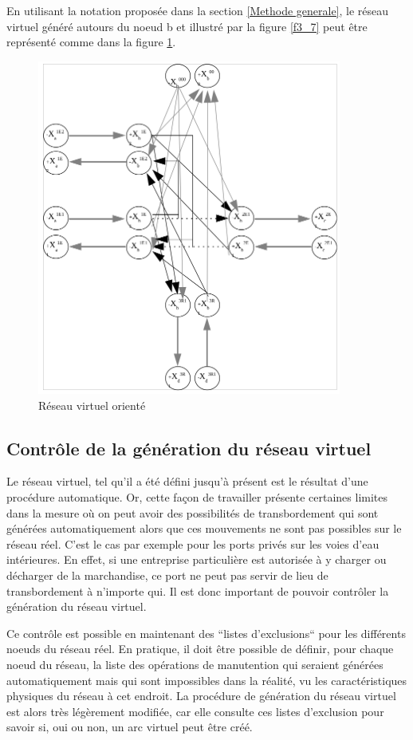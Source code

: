 En utilisant la notation proposée dans la section \ref{Methode generale}, le réseau virtuel généré autours du noeud b et illustré par la figure \ref{f3_7} peut être représenté comme dans la figure \ref{f3_7b}.

\begin{figure}[htbp]
\centerline{\includegraphics[width=10cm]{f3_7b.png}}
\caption{\label{f3_7b} R\'eseau virtuel orient\'e}
\end{figure}

\subsection{Contr\^ole de la g\'en\'eration du r\'eseau virtuel}


Le réseau virtuel, tel qu'il a été défini jusqu'à présent est le
résultat d'une procédure automatique. Or, cette façon de travailler
présente certaines limites dans la mesure où on peut avoir des
possibilités de transbordement qui sont générées automatiquement
alors que ces mouvements ne sont pas possibles sur le réseau réel.
C'est le cas par exemple pour les ports privés sur les voies d'eau
intérieures. En effet, si une entreprise particulière est autorisée
à y charger ou décharger de la marchandise, ce port ne peut pas
servir de lieu de transbordement à n'importe qui. Il est donc
important de pouvoir contrôler la génération du réseau virtuel.

Ce contrôle est possible en maintenant des ``listes d'exclusions``
pour les différents noeuds du réseau réel. En pratique, il doit
être possible de définir, pour chaque noeud du réseau, la liste des
opérations de manutention qui seraient générées automatiquement
mais qui sont impossibles dans la réalité, vu les caractéristiques
physiques du réseau à cet endroit. La procédure de génération du
réseau virtuel est alors très légèrement modifiée, car elle
consulte ces listes d'exclusion pour savoir si, oui ou non, un arc
virtuel peut être créé.

